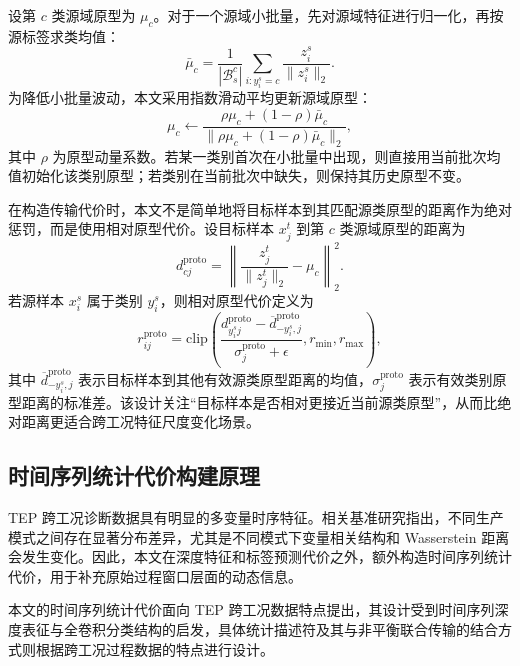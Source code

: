 \documentclass{seuthesis-2022}
\begin{document}
设第 $c$ 类源域原型为 $\mu_c$。对于一个源域小批量，先对源域特征进行归一化，再按源标签求类均值：
\begin{equation}
    \bar{\mu}_c
    =
    \frac{1}{|\mathcal{B}_s^c|}
    \sum_{i:y_i^s=c}
    \frac{z_i^s}{\|z_i^s\|_2}.
\end{equation}
为降低小批量波动，本文采用指数滑动平均更新源域原型：
\begin{equation}
    \mu_c
    \leftarrow
    \frac{\rho\mu_c+(1-\rho)\bar{\mu}_c}
    {\|\rho\mu_c+(1-\rho)\bar{\mu}_c\|_2},
\end{equation}
其中 $\rho$ 为原型动量系数。若某一类别首次在小批量中出现，则直接用当前批次均值初始化该类别原型；若类别在当前批次中缺失，则保持其历史原型不变。

在构造传输代价时，本文不是简单地将目标样本到其匹配源类原型的距离作为绝对惩罚，而是使用相对原型代价。设目标样本 $x_j^t$ 到第 $c$ 类源域原型的距离为
\begin{equation}
    d_{cj}^{\mathrm{proto}}
    =
    \left\|
    \frac{z_j^t}{\|z_j^t\|_2}
    -
    \mu_c
    \right\|_2^2.
\end{equation}
若源样本 $x_i^s$ 属于类别 $y_i^s$，则相对原型代价定义为
\begin{equation}
    r_{ij}^{\mathrm{proto}}
    =
    \mathrm{clip}
    \left(
    \frac{
    d_{y_i^s j}^{\mathrm{proto}}
    -
    \overline{d}_{-y_i^s,j}^{\mathrm{proto}}
    }{
    \sigma_j^{\mathrm{proto}}+\epsilon
    },
    r_{\min},r_{\max}
    \right),
\end{equation}
其中 $\overline{d}_{-y_i^s,j}^{\mathrm{proto}}$ 表示目标样本到其他有效源类原型距离的均值，$\sigma_j^{\mathrm{proto}}$ 表示有效类别原型距离的标准差。该设计关注“目标样本是否相对更接近当前源类原型”，从而比绝对距离更适合跨工况特征尺度变化场景。

\subsection{时间序列统计代价构建原理}

TEP 跨工况诊断数据具有明显的多变量时序特征。相关基准研究指出，不同生产模式之间存在显著分布差异，尤其是不同模式下变量相关结构和 Wasserstein 距离会发生变化\cite{montesuma2024benchmark}。因此，本文在深度特征和标签预测代价之外，额外构造时间序列统计代价，用于补充原始过程窗口层面的动态信息。

本文的时间序列统计代价面向 TEP 跨工况数据特点提出，其设计受到时间序列深度表征与全卷积分类结构的启发\cite{wang2017time,fawaz2019deep}，具体统计描述符及其与非平衡联合传输的结合方式则根据跨工况过程数据的特点进行设计。
\end{document}
